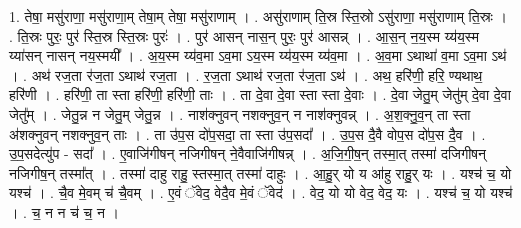 \documentclass[17pt]{extarticle}
\begin{document}
1. तेषा॒ मसु॑राणा॒ मसु॑राणा॒म् तेषा॒म् तेषा॒ मसु॑राणाम् । . असु॑राणाम् ति॒स्र स्ति॒स्रो ऽसु॑राणा॒ मसु॑राणाम् ति॒स्रः । . ति॒स्रः पुरः॒ पुर॑ स्ति॒स्र स्ति॒स्रः पुरः॑ । . पुर॑ आसन् नास॒न् पुरः॒ पुर॑ आसन्न् । . आ॒स॒न् न॒य॒स्म य्य॑य॒स्म य्या॑सन् नासन् नय॒स्मयी᳚ । . अ॒य॒स्म य्य॑व॒मा ऽव॒मा ऽय॒स्म य्य॑य॒स्म य्य॑व॒मा । . अ॒व॒मा ऽथाथा॑ व॒मा ऽव॒मा ऽथ॑ । . अथ॑ रज॒ता र॑ज॒ता ऽथाथ॑ रज॒ता । . र॒ज॒ता ऽथाथ॑ रज॒ता र॑ज॒ता ऽथ॑ । . अथ॒ हरि॑णी॒ हरि॒ ण्यथाथ॒ हरि॑णी । . हरि॑णी॒ ता स्ता हरि॑णी॒ हरि॑णी॒ ताः । . ता दे॒वा दे॒वा स्ता स्ता दे॒वाः । . दे॒वा जेतु॒म् जेतु॑म् दे॒वा दे॒वा जेतु᳚म् । . जेतु॒न्न न जेतु॒म् जेतु॒न्न । . नाश॑क्नुवन् नशक्नुव॒न् न नाश॑क्नुवन्न् । . अ॒श॒क्नु॒व॒न् ता स्ता अ॑शक्नुवन् नशक्नुव॒न् ताः । . ता उ॑प॒स दो॑प॒सदा॒ ता स्ता उ॑प॒सदा᳚ । . उ॒प॒स दै॒वै वोप॒स दो॑प॒स दै॒व । . उ॒प॒सदेत्यु॑प - सदा᳚ । . ए॒वाजि॑गीषन् नजिगीषन् ने॒वैवाजि॑गीषन्न् । . अ॒जि॒गी॒ष॒न् तस्मा॒त् तस्मा॑ दजिगीषन् नजिगीष॒न् तस्मा᳚त् । . तस्मा॑ दाहु राहु॒ स्तस्मा॒त् तस्मा॑ दाहुः । . आ॒हु॒र् यो य आ॑हु राहु॒र् यः । . यश्च॑ च॒ यो यश्च॑ । . चै॒व मे॒वम् च॑ चै॒वम् । . ए॒वं ॅवेद॒ वेदै॒व मे॒वं ॅवेद॑ । . वेद॒ यो यो वेद॒ वेद॒ यः । . यश्च॑ च॒ यो यश्च॑ । . च॒ न न च॑ च॒ न । \newline
\end{document}
